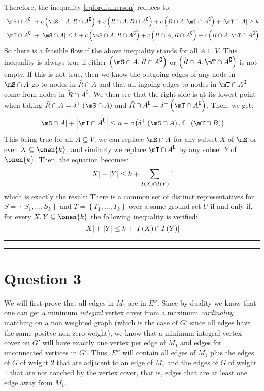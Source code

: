 \documentclass[math]{cours}
\def\bR{\bar{R}}
\def\tR{\tilde{R}}
\def\Ac{A^{\complement}}
\begin{document}
Therefore, the inequality \ref{eqfordfulkerson} reduces to:
\begin{align*}
	\abs{\mS \cap \Ac} + c\left(\mS\cap A, \bR\cap \Ac \right) + c\left(\bR\cap A, \tR\cap \Ac \right) + c\left( \tR\cap A, \mT\cap \Ac \right) + \abs{\mT \cap A} \geq k\\
	\abs{\mT \cap \Ac} + \abs{\mS\cap A} \leq k + c\left(\mS \cap A, \bR\cap\Ac \right) + c\left(\bR \cap A, \tR\cap \Ac \right) + c\left(\tR\cap A, \mT\cap\Ac \right)
\end{align*}
So there is a feasible flow if the above inequality stands for all $A \subseteq V$.
This inequality is always true if either $\left(\mS\cap A, \bR\cap \Ac \right)$ or $\left(\tR\cap A, \mT\cap \Ac \right)$ is not empty.
If this is not true, then we know the outgoing edges of any node in $\mS \cap A$ go to nodes in $\bR \cap A$ and that all ingoing edges to nodes in $\mT\cap \Ac$ come from nodes in $\tR\cap\Ac$.
We then see that the right side is at its lowest point when taking $\bR \cap A = \delta^{+}\left(\mS \cap A\right)$ and $\tR\cap \Ac = \delta^{-}\left( \mT\cap \Ac \right)$.
Then, we get:
\begin{equation*}
	\abs{\mS \cap A} + \abs{\mT\cap \Ac} \leq n + c\left(\delta^{+}\left(\mS\cap A \right), \delta^{-}\left( \mT\cap B \right) \right)
\end{equation*}
This being true for all $A \subseteq V$, we can replace $\mS\cap A$ for any subset $X$ of $\mS$ or even $X \subseteq \onen{k}$, and similarly we replace $\mT\cap \Ac$ by any subset $Y$ of $\onen{k}$.
Then, the equation becomes:
\begin{equation*}
	\left|X\right| + \left|Y\right| \leq k + \sum_{I\left(X\right) \cap I\left(Y\right)} 1
\end{equation*}
which is exactly the result:
There is a common set of distinct representatives for $S = \left\{S_{1}, \ldots, S_{k} \right\}$ and $T = \left\{T_{1}, \ldots, T_{k} \right\}$ over a same ground set $U$ if and only if, for every $X, Y \subseteq \onen{k}$ the following inequality is verified:
\begin{equation*}
	\left|X\right| + \left|Y\right| \leq k + \left|I\left(X\right) \cap I\left(Y\right)\right|
\end{equation*}

\medskip
\hrule\hrule
\medskip

\section{Question 3}
We will first prove that all edges in $M_{1}$ are in $E''$.
Since by duality we know that one can get a minimum \emph{integral} vertex cover from a maximum \emph{cardinality} matching on a non weighted graph (which is the case of $G'$ since all edges have the same positve non-zero weight), we know that a minimum integral vertex cover on $G'$ will have exactly one vertex per edge of $M_{1}$ and edges for unconnected vertices in $G'$.
Thus, $E''$ will contain all edges of $M_{1}$ plus the edges of $G$ of weight $2$ that are adjacent to an edge of $M_{1}$ and the edges of $G$ of weight $1$ that are not touched by the vertex cover, that is, edges that are at least one edge away from $M_{1}$.
\end{document}
